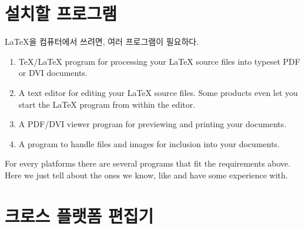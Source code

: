 \section{설치할 프로그램}
\LaTeX{}을 컴퓨터에서 쓰려면, 여러 프로그램이 필요하다.
\begin{enumerate}

\item \TeX{}/\LaTeX{} program for processing your \LaTeX{} source files
into typeset PDF or DVI documents.

\item A text editor for editing your \LaTeX{} source files. Some products even let
you start the \LaTeX{} program from within the editor.

\item A PDF/DVI viewer program for previewing and printing your
documents.

\item A program to handle \PSi{} files and images for inclusion into
your documents.

\end{enumerate}

For every platforms there are several programs that fit the requirements above.
Here we just tell about the ones we know, like and have some experience
with.

\section{크로스 플랫폼 편집기}
\label{sec:texmaker}

